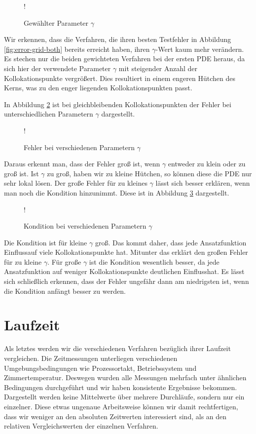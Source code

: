 \begin{figure}[ht]
\centering
\resizebox {\columnwidth} {!} {

}
\caption{Gewählter Parameter $\gamma$}
\label{fig:gamma-grid}
\end{figure}
Wir erkennen, dass die Verfahren, die ihren besten Testfehler in Abbildung \ref{fig:error-grid-both} bereits erreicht haben, ihren $\gamma$-Wert kaum mehr verändern. Es stechen nur die beiden gewichteten Verfahren bei der ersten \ac{PDE} heraus, da sich hier der verwendete Parameter $\gamma$ mit steigender Anzahl der Kollokationspunkte vergrößert. Dies resultiert in einem engeren \glqq Hütchen\grqq{} des Kerns, was zu den enger liegenden Kollokationspunkten passt.

In Abbildung \ref{fig:gamma-fehler} ist bei gleichbleibenden Kollokationspunkten der Fehler bei unterschiedlichen Parametern $\gamma$ dargestellt.

\begin{figure}[ht]
\centering
\resizebox {\columnwidth} {!} {

}
\caption{Fehler bei verschiedenen Parametern $\gamma$}
\label{fig:gamma-fehler}
\end{figure}

Daraus erkennt man, dass der Fehler groß ist, wenn $\gamma$ entweder zu klein oder zu groß ist. Ist $\gamma$ zu groß, haben wir zu kleine \glqq Hütchen\grqq , so können diese die \ac{PDE} nur sehr lokal lösen. Der große Fehler für zu kleines $\gamma$ lässt sich besser erklären, wenn man noch die Kondition hinzunimmt. Diese ist in Abbildung \ref{fig:kondition} dargestellt.

\begin{figure}[ht]
\centering
\resizebox {\columnwidth} {!} {

}
\caption{Kondition bei verschiedenen Parametern $\gamma$}
\label{fig:kondition}
\end{figure}

Die Kondition ist für kleine $\gamma$ groß. Das kommt daher, dass jede Ansatzfunktion \glqq Einfluss\grqq  auf viele Kollokationspunkte hat. Mitunter das erklärt den großen Fehler für zu kleine $\gamma$. Für große $\gamma$ ist die Kondition wesentlich besser, da jede Ansatzfunktion auf weniger Kollokationspunkte deutlichen \glqq Einfluss\grqq  hat. Es lässt sich schließlich erkennen, dass der Fehler ungefähr dann am niedrigsten ist, wenn die Kondition anfängt besser zu werden. 

\section{Laufzeit}
Als letztes werden wir die verschiedenen Verfahren bezüglich ihrer Laufzeit vergleichen. Die Zeitmessungen unterliegen verschiedenen Umgebungsbedingungen wie Prozessortakt, Betriebssystem und Zimmertemperatur. Deswegen wurden alle Messungen mehrfach unter ähnlichen Bedingungen durchgeführt und wir haben konsistente Ergebnisse bekommen. Dargestellt werden keine Mittelwerte über mehrere Durchläufe, sondern nur ein einzelner. Diese etwas ungenaue Arbeitsweise können wir damit rechtfertigen, dass wir weniger an den absoluten Zeitwerten interessiert sind, als an den relativen Vergleichswerten der einzelnen Verfahren.

